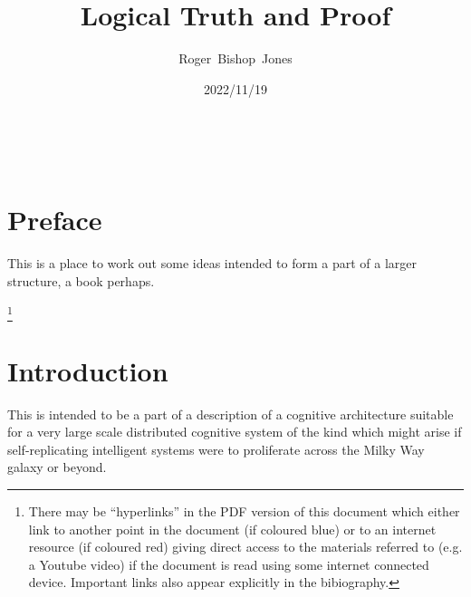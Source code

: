 \documentclass[10pt,titlepage]{article}
\title{\LARGE\bf Logical Truth and Proof}
\author{Roger~Bishop~Jones}
\date{\small 2022/11/19}
\newcommand{\ignore}[1]{}
\begin{document}
                               
\begin{titlepage}
\maketitle





\end{titlepage}

\ \

\ignore{
\begin{centering}
{}
\end{centering}
}%

\setcounter{tocdepth}{2}
{\parskip-0pt\tableofcontents}


\pagebreak

\section*{Preface}

This is a place to work out some ideas intended to form a part of a larger structure, a book perhaps.

\footnote{There may be ``hyperlinks'' in the PDF version of this document which either link to another point in the document  (if coloured blue) or to an internet resource  (if coloured red) giving direct access to the materials referred to (e.g. a Youtube video) if the document is read using some internet connected device.
Important links also appear explicitly in the bibiography.}

\section{Introduction}

This is intended to be a part of a description of a cognitive architecture suitable for a very large scale distributed cognitive system of the kind which might arise if self-replicating intelligent systems were to proliferate across the Milky Way galaxy or beyond.
\end{document}
